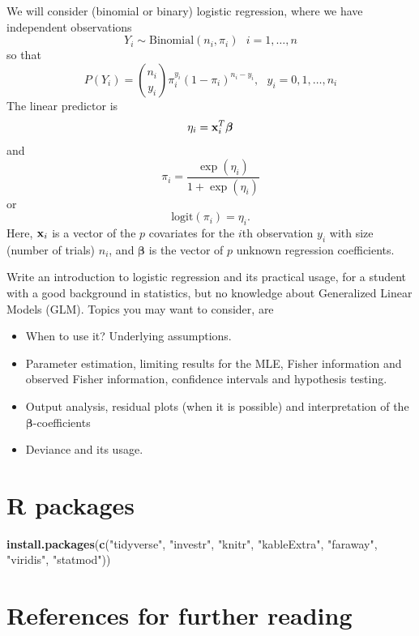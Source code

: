 \documentclass[
]{article}
\newenvironment{Shaded}{\begin{snugshade}}{\end{snugshade}}
\newcommand{\FunctionTok}[1]{\textcolor[rgb]{0.13,0.29,0.53}{\textbf{#1}}}
\newcommand{\NormalTok}[1]{#1}
\newcommand{\StringTok}[1]{\textcolor[rgb]{0.31,0.60,0.02}{#1}}
\providecommand{\tightlist}{%
  \setlength{\itemsep}{0pt}\setlength{\parskip}{0pt}}
\begin{document}
We will consider (binomial or binary) logistic regression, where we have
independent observations
\[Y_i \sim \text{Binomial}(n_i,\pi_i) \text{ } i=1,\ldots,n\] so that
\[P(Y_i)=\binom{n_i}{y_i}\pi_i^{y_i}(1-\pi_i)^{n_i-y_i}, \text{ } y_i=0,1,\ldots, n_i\]
The linear predictor is \[ \eta_i={\bf x}_i^T\boldsymbol{\beta}\] and
\[ \pi_i=\frac{\exp(\eta_i)}{1+\exp(\eta_i)}\] or
\[ \text{logit}(\pi_i)=\eta_i.\] Here, \({\bf x}_i\) is a vector of the
\(p\) covariates for the \(i\)th observation \(y_i\) with size (number
of trials) \(n_i\), and \(\boldsymbol{\beta}\) is the vector of \(p\)
unknown regression coefficients.

Write an introduction to logistic regression and its practical usage,
for a student with a good background in statistics, but no knowledge
about Generalized Linear Models (GLM). Topics you may want to consider,
are

\begin{itemize}
\tightlist
\item
  When to use it? Underlying assumptions.
\item
  Parameter estimation, limiting results for the MLE, Fisher information
  and observed Fisher information, confidence intervals and hypothesis
  testing.
\item
  Output analysis, residual plots (when it is possible) and
  interpretation of the \(\boldsymbol{\beta}\)-coefficients
\item
  Deviance and its usage.
\end{itemize}

\hypertarget{r-packages}{%
\section{R packages}\label{r-packages}}

\begin{Shaded}
\begin{Highlighting}[]
\FunctionTok{install.packages}\NormalTok{(}\FunctionTok{c}\NormalTok{(}\StringTok{"tidyverse"}\NormalTok{,}
                   \StringTok{"investr"}\NormalTok{,}
                   \StringTok{"knitr"}\NormalTok{,}
                   \StringTok{"kableExtra"}\NormalTok{,}
                   \StringTok{"faraway"}\NormalTok{,}
                   \StringTok{"viridis"}\NormalTok{,}
                   \StringTok{"statmod"}\NormalTok{))}
\end{Highlighting}
\end{Shaded}

\hypertarget{references-for-further-reading}{%
\section{References for further
reading}\label{references-for-further-reading}}
\end{document}
